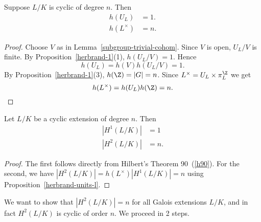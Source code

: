 \begin{pr}
Suppose $L/K$ is cyclic of degree $n$. Then
\begin{align*}
h(U_L)&=1.\\
h(L^{\times})&=n.
\end{align*}
\end{pr}
\begin{proof}
Choose $V$ as in Lemma~\ref{subgroup-trivial-cohom}. Since $V$ is open, $U_L/V$ is finite. By Proposition~\ref{herbrand-1}(1), $h(U_L/V)=1$. Hence
\[
h(U_L)=h(V)h(U_L/V)=1.
\]
By Proposition~\ref{herbrand-1}(3), $h(\Z)=|G|=n$. 
Since $L^{\times}=U_L\times \pi_L^{\Z}$ we get %
\[
h(L^{\times})=h(U_L)h(\Z)=n.
\]
\end{proof}
\begin{thm}
Let $L/K$ be a cyclic extension of degree $n$. Then
\begin{align*}
|H^1(L/K)|&=1\\
|H^2(L/K)|&=n.
\end{align*}
\end{thm}
\begin{proof}
The first follows directly from Hilbert's Theorem 90~(\ref{h90}). For the second, we have $|H^2(L/K)|=h(L^{\times})|H^1(L/K)|=n$ using Proposition~\ref{herbrand-units-l}.
\end{proof}
We want to show that $|H^2(L/K)|=n$ for all Galois extensions $L/K$, and in fact $H^2(L/K)$ is cyclic of order $n$. We proceed in 2 steps.
